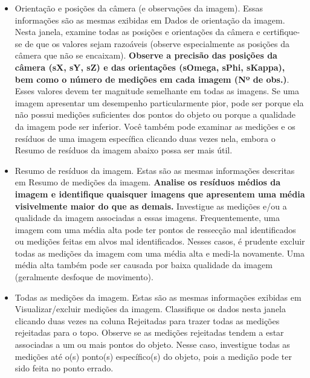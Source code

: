 \documentclass[
  12pt,
  letterpaper,
  DIV=11,
  numbers=noendperiod]{scrreprt}
\providecommand{\tightlist}{%
  \setlength{\itemsep}{0pt}\setlength{\parskip}{0pt}}
\begin{document}
\begin{itemize}
\tightlist
\item
  Orientação e posições da câmera (e observações da imagem). Essas
  informações são as mesmas exibidas em Dados de orientação da imagem.
  Nesta janela, examine todas as posições e orientações da câmera e
  certifique-se de que os valores sejam razoáveis
  \hspace{0pt}\hspace{0pt}(observe especialmente as posições da câmera
  que não se encaixam). \textbf{Observe a precisão das posições da
  câmera (sX, sY, sZ) e das orientações (sOmega, sPhi, sKappa), bem como
  o número de medições em cada imagem (Nº de obs.)}. Esses valores devem
  ter magnitude semelhante em todas as imagens. Se uma imagem apresentar
  um desempenho particularmente pior, pode ser porque ela não possui
  medições suficientes dos pontos do objeto ou porque a qualidade da
  imagem pode ser inferior. Você também pode examinar as medições e os
  resíduos de uma imagem específica clicando duas vezes nela, embora o
  Resumo de resíduos da imagem abaixo possa ser mais útil.
\end{itemize}

\begin{itemize}
\tightlist
\item
  Resumo de resíduos da imagem. Estas são as mesmas informações
  descritas em Resumo de medições da imagem. \textbf{Analise os resíduos
  médios da imagem e identifique quaisquer imagens que apresentem uma
  média visivelmente maior do que as demais.} Investigue as medições
  e/ou a qualidade da imagem associadas a essas imagens. Frequentemente,
  uma imagem com uma média alta pode ter pontos de ressecção mal
  identificados ou medições feitas em alvos mal identificados. Nesses
  casos, é prudente excluir todas as medições da imagem com uma média
  alta e medi-la novamente. Uma média alta também pode ser causada por
  baixa qualidade da imagem (geralmente desfoque de movimento).
\end{itemize}

\begin{itemize}
\tightlist
\item
  Todas as medições da imagem. Estas são as mesmas informações exibidas
  em Visualizar/excluir medições da imagem. Classifique os dados nesta
  janela clicando duas vezes na coluna Rejeitadas para trazer todas as
  medições rejeitadas para o topo. Observe se as medições rejeitadas
  tendem a estar associadas a um ou mais pontos do objeto. Nesse caso,
  investigue todas as medições até o(s) ponto(s) específico(s) do
  objeto, pois a medição pode ter sido feita no ponto errado.
\end{itemize}
\end{document}

